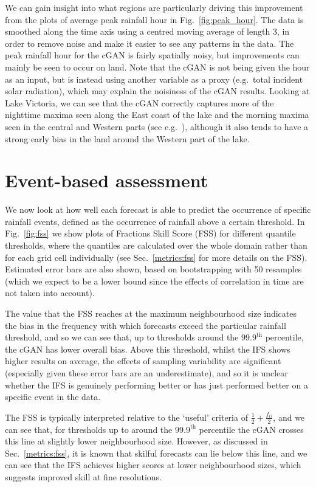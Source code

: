 \documentclass[../main.tex]{subfiles}
\begin{document}
We can gain insight into what regions are particularly driving this improvement from the plots of average peak rainfall hour in Fig.~\ref{fig:peak_hour}. The data is smoothed along the time axis using a centred moving average of length 3, in order to remove noise and make it easier to see any patterns in the data. The peak rainfall hour for the cGAN is fairly spatially noisy, but improvements can mainly be seen to occur on land. Note that the cGAN is not being given the hour as an input, but is instead using another variable as a proxy (e.g.~total incident solar radiation), which may explain the noisiness of the cGAN results. Looking at Lake Victoria, we can see that the cGAN correctly captures more of the nighttime maxima seen along the East coast of the lake and the morning maxima seen in the central and Western parts (see e.g.~\cite{woodhams_identifying_2019}), although it also tends to have a strong early bias in the land around the Western part of the lake.


\section{Event-based assessment}


We now look at how well each forecast is able to predict the occurrence of specific rainfall events, defined as the occurrence of rainfall above a certain threshold. In Fig.~\ref{fig:fss} we show plots of Fractions Skill Score (FSS) for different quantile thresholds, where the quantiles are calculated over the whole domain rather than for each grid cell individually (see Sec.~\ref{metrics:fss} for more details on the FSS). Estimated error bars are also shown, based on bootstrapping with 50 resamples (which we expect to be a lower bound since the effects of correlation in time are not taken into account). 

The value that the FSS reaches at the maximum neighbourhood size indicates the bias in the frequency with which forecasts exceed the particular rainfall threshold, and so we can see that, up to thresholds around the $99.9^{\text{th}}$ percentile, the cGAN has lower overall bias. Above this threshold, whilst the IFS shows higher results on average, the effects of sampling variability are significant (especially given these error bars are an underestimate), and so it is unclear whether the IFS is genuinely performing better or has just performed better on a specific event in the data. 

The FSS is typically interpreted relative to the `useful' criteria of $\frac{1}{2} + \frac{f_O}{2}$, and we can see that, for thresholds up to around the $99.9^{\text{th}}$ percentile the cGAN crosses this line at slightly lower neighbourhood size. However, as discussed in Sec.~\ref{metrics:fss}, it is known that skilful forecasts can lie below this line, and we can see that the IFS achieves higher scores at lower neighbourhood sizes, which suggests improved skill at fine resolutions. 
\end{document}
